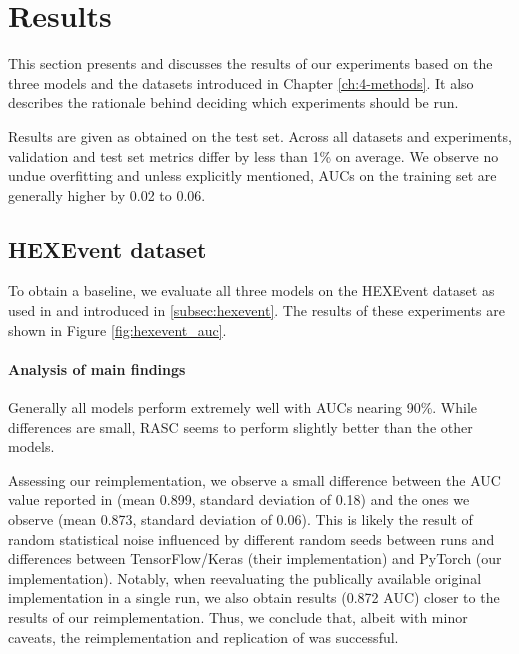 \chapter{\label{ch:ch5-results}Results}
This section presents and discusses the results of our experiments based on the three models and the datasets introduced in Chapter \ref{ch:4-methods}. It also describes the rationale behind deciding which experiments should be run.

Results are given as obtained on the test set. Across all datasets and experiments, validation and test set metrics differ by less than 1\% on average. We observe no undue overfitting and unless explicitly mentioned, AUCs on the training set are generally higher by 0.02 to 0.06. 
\section{HEXEvent dataset} \label{sec:hexevent_results}
To obtain a baseline, we evaluate all three models on the HEXEvent dataset as used in \cite{dsc} and introduced in \ref{subsec:hexevent}. The results of these experiments are shown in Figure \ref{fig:hexevent_auc}.

\subsubsection{Analysis of main findings}
Generally all models perform extremely well with AUCs nearing 90\%. While differences are small, RASC seems to perform slightly better than the other models.

Assessing our reimplementation, we observe a small difference between the AUC value reported in \cite{dsc} (mean 0.899, standard deviation of 0.18) and the ones we observe (mean 0.873, standard deviation of 0.06). This is likely the result of random statistical noise influenced by different random seeds between runs and differences between TensorFlow/Keras (their implementation) and PyTorch (our implementation). Notably, when reevaluating the publically available original implementation in a single run, we also obtain results (0.872 AUC) closer to the results of our reimplementation. 
Thus, we conclude that, albeit with minor caveats, the reimplementation and replication of \cite{dsc} was successful.

